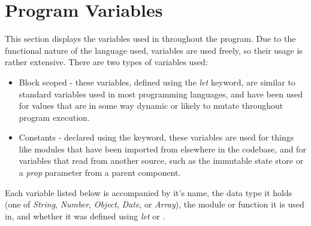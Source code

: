 \section{Program Variables}
This section displays the variables used in throughout the program. Due to the functional nature of the language used, variables are used freely, so their usage is rather extensive. There are two types of variables used:

\begin{itemize}
  \item Block scoped - these variables, defined using the \textit{let} keyword, are similar to standard variables used in most programming languages, and have been used for values that are in some way dynamic or likely to mutate throughout program execution.
  \item Constants - declared using the  keyword, these variables are used for things like modules that have been imported from elsewhere in the codebase, and for variables that read from another source, such as the immutable state store or a \textit{prop} parameter from a parent component.
\end{itemize}

Each variable listed below is accompanied by it's name, the data type it holds (one of \textit{String}, \textit{Number}, \textit{Object}, \textit{Date}, or \textit{Array}), the module or function it is used in, and whether it was defined using \textit{let} or .